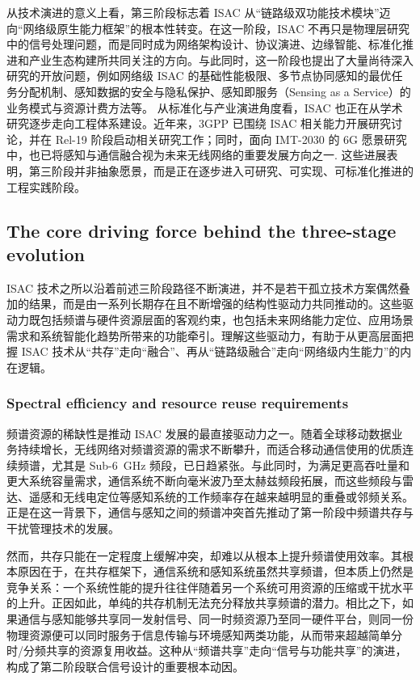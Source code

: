 从技术演进的意义上看，第三阶段标志着 ISAC 从“链路级双功能技术模块”迈向“网络级原生能力框架”的根本性转变\cite{Liu2022ISAC,Zhang2020perceptive,Cui2024integrated}。在这一阶段，ISAC 不再只是物理层研究中的信号处理问题，而是同时成为网络架构设计、协议演进、边缘智能、标准化推进和产业生态构建所共同关注的方向。与此同时，这一阶段也提出了大量尚待深入研究的开放问题，例如网络级 ISAC 的基础性能极限、多节点协同感知的最优任务分配机制、感知数据的安全与隐私保护、感知即服务（Sensing as a Service）的业务模式与资源计费方法等\cite{Gonzalez2024integrated,Cui2024integrated}。
从标准化与产业演进角度看，ISAC 也正在从学术研究逐步走向工程体系建设。近年来，3GPP 已围绕 ISAC 相关能力开展研究讨论，并在 Rel-19 阶段启动相关研究工作；同时，面向 IMT-2030 的 6G 愿景研究中，也已将感知与通信融合视为未来无线网络的重要发展方向之一\cite{IMT2030Framework,ThreeGPPRel19ISAC}. 这些进展表明，第三阶段并非抽象愿景，而是正在逐步进入可研究、可实现、可标准化推进的工程实践阶段。

\subsection{The core driving force behind the three-stage evolution}
\label{subsec:ch1-evolution-driving-force}

ISAC 技术之所以沿着前述三阶段路径不断演进，并不是若干孤立技术方案偶然叠加的结果，而是由一系列长期存在且不断增强的结构性驱动力共同推动的。这些驱动力既包括频谱与硬件资源层面的客观约束，也包括未来网络能力定位、应用场景需求和系统智能化趋势所带来的功能牵引。理解这些驱动力，有助于从更高层面把握 ISAC 技术从“共存”走向“融合”、再从“链路级融合”走向“网络级内生能力”的内在逻辑。

\subsubsection{Spectral efficiency and resource reuse requirements}
\label{subsubsec:ch1-driving-force-spectrum}

频谱资源的稀缺性是推动 ISAC 发展的最直接驱动力之一。随着全球移动数据业务持续增长，无线网络对频谱资源的需求不断攀升，而适合移动通信使用的优质连续频谱，尤其是 Sub-6~GHz 频段，已日趋紧张\cite{ITU_R_RR2024,miit_radio_freq_2026_en,Saad2020Vision6G}。与此同时，为满足更高吞吐量和更大系统容量需求，通信系统不断向毫米波乃至太赫兹频段拓展，而这些频段与雷达、遥感和无线电定位等感知系统的工作频率存在越来越明显的重叠或邻频关系\cite{Liu2022ISAC}。正是在这一背景下，通信与感知之间的频谱冲突首先推动了第一阶段中频谱共存与干扰管理技术的发展。

然而，共存只能在一定程度上缓解冲突，却难以从根本上提升频谱使用效率。其根本原因在于，在共存框架下，通信系统和感知系统虽然共享频谱，但本质上仍然是竞争关系：一个系统性能的提升往往伴随着另一个系统可用资源的压缩或干扰水平的上升\cite{Liu2020JointRadarComm,Chiriyath2017RadarCommCoexistence}。正因如此，单纯的共存机制无法充分释放共享频谱的潜力。相比之下，如果通信与感知能够共享同一发射信号、同一时频资源乃至同一硬件平台，则同一份物理资源便可以同时服务于信息传输与环境感知两类功能，从而带来超越简单分时/分频共享的资源复用收益。这种从“频谱共享”走向“信号与功能共享”的演进，构成了第二阶段联合信号设计的重要根本动因\cite{Liu2022ISAC,Hassanien2015dual}。

